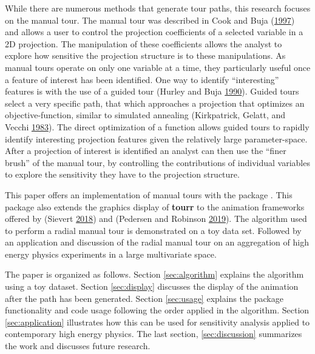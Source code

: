 While there are numerous methods that generate tour paths, this research
focuses on the manual tour. The manual tour was described in Cook and
Buja (\protect\hyperlink{ref-cook_manual_1997}{1997}) and allows a user
to control the projection coefficients of a selected variable in a 2D
projection. The manipulation of these coefficients allows the analyst to
explore how sensitive the projection structure is to these
manipulations. As manual tours operate on only one variable at a time,
they particularly useful once a feature of interest has been identified.
One way to identify ``interesting'' features is with the use of a guided
tour (Hurley and Buja
\protect\hyperlink{ref-hurley_analyzing_1990}{1990}). Guided tours
select a very specific path, that which approaches a projection that
optimizes an objective-function, similar to simulated annealing
(Kirkpatrick, Gelatt, and Vecchi
\protect\hyperlink{ref-kirkpatrick_optimization_1983}{1983}). The direct
optimization of a function allows guided tours to rapidly identify
interesting projection features given the relatively large
parameter-space. After a projection of interest is identified an analyst
can then use the ``finer brush'' of the manual tour, by controlling the
contributions of individual variables to explore the sensitivity they
have to the projection structure.

This paper offers an implementation of manual tours with the package
. This package also extends the graphics display of
\textbf{tourr} to the animation frameworks offered by 
(Sievert \protect\hyperlink{ref-sievert_plotly_2018}{2018}) and
 (Pedersen and Robinson
\protect\hyperlink{ref-pedersen_gganimate:_2019}{2019}). The algorithm
used to perform a radial manual tour is demonstrated on a toy data set.
Followed by an application and discussion of the radial manual tour on
an aggregation of high energy physics experiments in a large
multivariate space.

The paper is organized as follows. Section \ref{sec:algorithm} explains
the algorithm using a toy dataset. Section \ref{sec:display} discusses
the display of the animation after the path has been generated. Section
\ref{sec:usage} explains the package functionality and code usage
following the order applied in the algorithm. Section
\ref{sec:application} illustrates how this can be used for sensitivity
analysis applied to contemporary high energy physics. The last section,
\ref{sec:discussion} summarizes the work and discusses future research.


